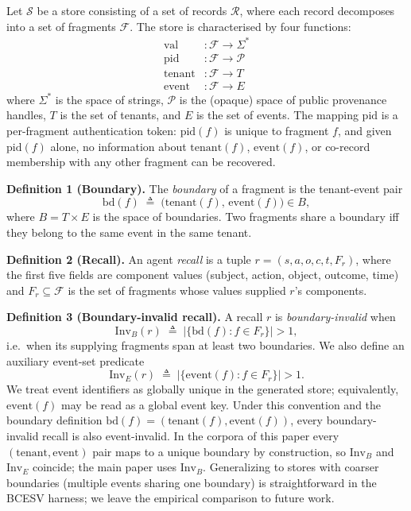 \documentclass[conference,compsoc]{IEEEtran}
\begin{document}
Let $\mathcal{S}$ be a store consisting of a set of records $\mathcal{R}$, where each record decomposes into a set of fragments $\mathcal{F}$. The store is characterised by four functions:
\begin{align}
  \mathrm{val}      &: \mathcal{F} \to \Sigma^{*} \\
  \mathrm{pid}      &: \mathcal{F} \to \mathcal{P} \\
  \mathrm{tenant}   &: \mathcal{F} \to T \\
  \mathrm{event}    &: \mathcal{F} \to E
\end{align}
where $\Sigma^{*}$ is the space of strings, $\mathcal{P}$ is the (opaque) space of public provenance handles, $T$ is the set of tenants, and $E$ is the set of events. The mapping $\mathrm{pid}$ is a per-fragment authentication token: $\mathrm{pid}(f)$ is unique to fragment $f$, and given $\mathrm{pid}(f)$ alone, no information about $\mathrm{tenant}(f)$, $\mathrm{event}(f)$, or co-record membership with any other fragment can be recovered.

\textbf{Definition 1 (Boundary).} The \emph{boundary} of a fragment is the tenant-event pair
\begin{equation}
\mathrm{bd}(f) \;\triangleq\; \bigl(\mathrm{tenant}(f),\,\mathrm{event}(f)\bigr) \in B,
\end{equation}
where $B = T \times E$ is the space of boundaries. Two fragments share a boundary iff they belong to the same event in the same tenant.

\textbf{Definition 2 (Recall).} An agent \emph{recall} is a tuple $r = (s, a, o, c, t, F_{r})$, where the first five fields are component values (subject, action, object, outcome, time) and $F_{r} \subseteq \mathcal{F}$ is the set of fragments whose values supplied $r$'s components.

\textbf{Definition 3 (Boundary-invalid recall).} A recall $r$ is \emph{boundary-invalid} when
\begin{equation}
\mathrm{Inv}_{B}(r) \;\triangleq\; \bigl|\{\mathrm{bd}(f) : f \in F_{r}\}\bigr| > 1, \label{eq:inv-b}
\end{equation}
i.e.\ when its supplying fragments span at least two boundaries. We also define an auxiliary event-set predicate
\begin{equation}
  \mathrm{Inv}_{E}(r) \;\triangleq\; \bigl|\{\mathrm{event}(f) : f \in F_{r}\}\bigr| > 1. \label{eq:inv-e}
\end{equation}
We treat event identifiers as globally unique in the generated store; equivalently, $\mathrm{event}(f)$ may be read as a global event key. Under this convention and the boundary definition $\mathrm{bd}(f) = (\mathrm{tenant}(f),\mathrm{event}(f))$, every boundary-invalid recall is also event-invalid. In the corpora of this paper every $(\mathrm{tenant}, \mathrm{event})$ pair maps to a unique boundary by construction, so $\mathrm{Inv}_{B}$ and $\mathrm{Inv}_{E}$ coincide; the main paper uses $\mathrm{Inv}_{B}$. Generalizing to stores with coarser boundaries (multiple events sharing one boundary) is straightforward in the BCESV harness; we leave the empirical comparison to future work.
\end{document}
